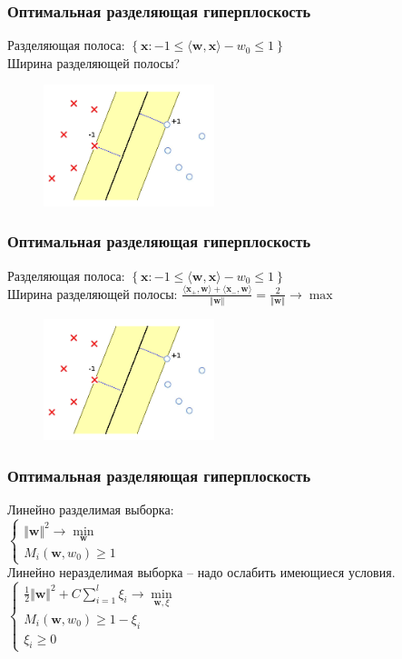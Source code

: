 \documentclass[12pt]{beamer}
\begin{document}
\begin{frame}\frametitle{Оптимальная разделяющая гиперплоскость}
Разделяющая полоса: $\left\{\mathbf{x}: -1 \leq \langle \mathbf{w}, \mathbf{x}\rangle - w_0 \leq 1\right\}$\\
Ширина разделяющей полосы?
\begin{figure}[htbp]
  \includegraphics[height=100pt, keepaspectratio = true]{images/linearly_separable2}   
\end{figure}
\end{frame}

\begin{frame}\frametitle{Оптимальная разделяющая гиперплоскость}
Разделяющая полоса: $\left\{\mathbf{x}: -1 \leq \langle \mathbf{w}, \mathbf{x}\rangle - w_0 \leq 1\right\}$\\
Ширина разделяющей полосы: $\frac{\langle \mathbf{x_{+}}, \mathbf{w} \rangle + \langle \mathbf{x_{-}}, \mathbf{w} \rangle}{\Vert \mathbf{w} \Vert} = \frac{2}{\Vert \mathbf{w} \Vert} \rightarrow \max$\\

\begin{figure}[htbp]
  \includegraphics[height=100pt, keepaspectratio = true]{images/linearly_separable2}   
\end{figure}
\end{frame}

\begin{frame}\frametitle{Оптимальная разделяющая гиперплоскость}
Линейно разделимая выборка:\\
$\begin{cases}
{\Vert \mathbf{w} \Vert^2 \rightarrow \min\limits_{\mathbf{w}}}\\
M_i(\mathbf{w}, w_0) \geq 1
\end{cases}$\\
Линейно неразделимая выборка -- надо ослабить имеющиеся условия.\\
$\begin{cases}
{\frac{1}{2}\Vert \mathbf{w} \Vert^2 + C \sum\limits_{i=1}^l \xi_i \rightarrow \min\limits_{\mathbf{w}, \xi}}\\
M_i(\mathbf{w}, w_0) \geq 1 - \xi_i\\
\xi_i \geq 0
\end{cases}$\\
\end{frame}
\end{document}
